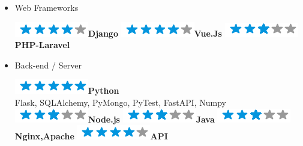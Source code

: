 \documentclass[]{friggeri-cv}
\begin{document}
\begin{flushleft}
\begin{multicols}{3}
\begin{itemize}
\item \large Web Frameworks \
\normalsize
\begin{flushleft}

\includegraphics[scale=0.40]{res/img/4stars.png}\hspace{1.5mm}\textbf{Django}
\includegraphics[scale=0.40]{res/img/4stars.png}\hspace{1.5mm}\textbf{Vue.Js}
\includegraphics[scale=0.40]{res/img/3stars.png}\hspace{1.5mm}\textbf{PHP-Laravel}
\end{flushleft}            

\columnbreak
\item \large Back-end / Server \
\normalsize
\begin{flushleft}

\includegraphics[scale=0.40]{res/img/5stars.png}\hspace{1.5mm}\textbf{Python}\\Flask, SQLAlchemy, PyMongo, PyTest, FastAPI, Numpy\\\vspace{2mm}
\includegraphics[scale=0.40]{res/img/3stars.png}\hspace{1.5mm}\textbf{Node.js}
\includegraphics[scale=0.40]{res/img/3stars.png}\hspace{1.5mm}\textbf{Java}
\includegraphics[scale=0.40]{res/img/3stars.png}\hspace{1.5mm}\textbf{\small Nginx,Apache}
\includegraphics[scale=0.40]{res/img/4stars.png}\hspace{1.5mm}\textbf{API}
\end{flushleft}            


\end{itemize}
\end{multicols}
\end{flushleft}
\end{document}
